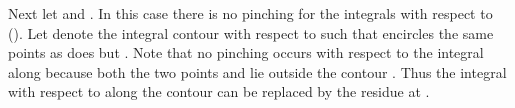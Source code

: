 \documentclass[a4paper,10pt]{article}
\begin{document}
Next let \coordHE{} and \coordHE{}. 
In this case there is no pinching for the integrals 
with respect to \coordHE{} (\coordHE{}). 
Let \coordHE{} denote the integral contour with 
respect to \coordHE{} such that \coordHE{} encircles 
the same points as \coordHE{} does but \coordHE{}. Note that 
no pinching occurs with respect to the integral along 
\coordHE{} because both the two points \coordHE{} 
and \coordHE{} lie outside the contour \coordHE{}. 
Thus the integral with respect to \coordHE{} along 
the contour \coordHE{} can be replaced by the 
residue at \coordHE{}. 
\end{document}
